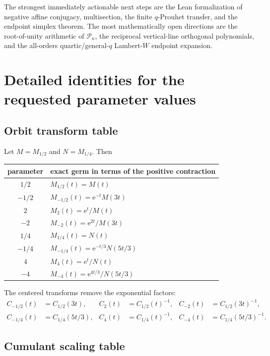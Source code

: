 \documentclass[11pt,oneside]{article}
\numberwithin{equation}{section}
\theoremstyle{definition}
\theoremstyle{remark}
\newcommand{\e}{\mathrm e}
\begin{document}
The strongest immediately actionable next steps are the Lean formalization of
negative affine conjugacy, multisection, the finite $q$-Prouhet transfer, and
the endpoint simplex theorem.  The most mathematically open directions are the
root-of-unity arithmetic of $\mathcal P_n$, the reciprocal vertical-line
orthogonal polynomials, and the all-orders quartic/general-$q$ Lambert-$W$
endpoint expansion.

\appendix

\section{Detailed identities for the requested parameter values}
\label{app:requested-values}

\subsection{Orbit transform table}

Let $M=M_{1/2}$ and $N=M_{1/4}$.  Then
\begin{center}
\begin{tabularx}{0.96\textwidth}{c X}
\toprule
parameter & exact germ in terms of the positive contraction \\
\midrule
$1/2$ & $M_{1/2}(t)=M(t)$ \\
$-1/2$ & $M_{-1/2}(t)=\e^{-t}M(3t)$ \\
$2$ & $M_2(t)=\e^t/M(t)$ \\
$-2$ & $M_{-2}(t)=\e^{2t}/M(3t)$ \\
\addlinespace
$1/4$ & $M_{1/4}(t)=N(t)$ \\
$-1/4$ & $M_{-1/4}(t)=\e^{-t/3}N(5t/3)$ \\
$4$ & $M_4(t)=\e^t/N(t)$ \\
$-4$ & $M_{-4}(t)=\e^{4t/3}/N(5t/3)$ \\
\bottomrule
\end{tabularx}
\end{center}

The centered transforms remove the exponential factors:
\begin{align*}
 C_{-1/2}(t)&=C_{1/2}(3t),
 &C_2(t)&=C_{1/2}(t)^{-1},
 &C_{-2}(t)&=C_{1/2}(3t)^{-1},\\
 C_{-1/4}(t)&=C_{1/4}(5t/3),
 &C_4(t)&=C_{1/4}(t)^{-1},
 &C_{-4}(t)&=C_{1/4}(5t/3)^{-1}.
\end{align*}

\subsection{Cumulant scaling table}
\end{document}
